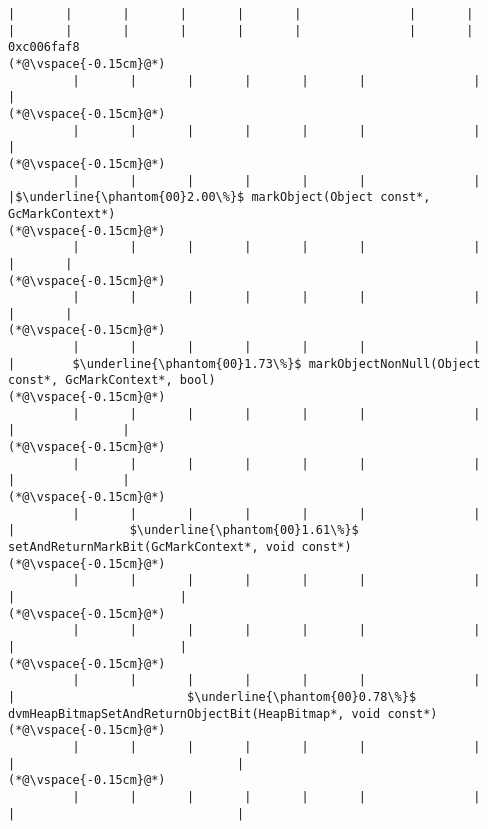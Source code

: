 \begin{lstlisting}[caption=NewDirectByteBuffer, label=profile:C2JNewDirectBuffer-512, numberbychapter=true, frame=lines, float, floatplacement=t]
         |       |       |       |       |       |               |       |                |       |       |       |       |       |               |       |               0xc006faf8
(*@\vspace{-0.15cm}@*)
         |       |       |       |       |       |               |       |
(*@\vspace{-0.15cm}@*)
         |       |       |       |       |       |               |       |
(*@\vspace{-0.15cm}@*)
         |       |       |       |       |       |               |       |$\underline{\phantom{00}2.00\%}$ markObject(Object const*, GcMarkContext*)
(*@\vspace{-0.15cm}@*)
         |       |       |       |       |       |               |       |       |
(*@\vspace{-0.15cm}@*)
         |       |       |       |       |       |               |       |       |
(*@\vspace{-0.15cm}@*)
         |       |       |       |       |       |               |       |        $\underline{\phantom{00}1.73\%}$ markObjectNonNull(Object const*, GcMarkContext*, bool)
(*@\vspace{-0.15cm}@*)
         |       |       |       |       |       |               |       |               |
(*@\vspace{-0.15cm}@*)
         |       |       |       |       |       |               |       |               |
(*@\vspace{-0.15cm}@*)
         |       |       |       |       |       |               |       |                $\underline{\phantom{00}1.61\%}$ setAndReturnMarkBit(GcMarkContext*, void const*)
(*@\vspace{-0.15cm}@*)
         |       |       |       |       |       |               |       |                       |
(*@\vspace{-0.15cm}@*)
         |       |       |       |       |       |               |       |                       |
(*@\vspace{-0.15cm}@*)
         |       |       |       |       |       |               |       |                        $\underline{\phantom{00}0.78\%}$ dvmHeapBitmapSetAndReturnObjectBit(HeapBitmap*, void const*)
(*@\vspace{-0.15cm}@*)
         |       |       |       |       |       |               |       |                               |
(*@\vspace{-0.15cm}@*)
         |       |       |       |       |       |               |       |                               |

\end{lstlisting}
